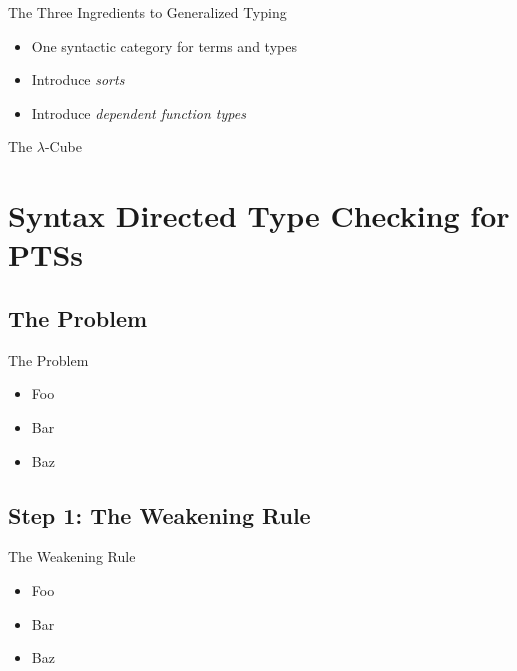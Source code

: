 \documentclass{beamer}
\begin{document}
\begin{frame}{The Three Ingredients to Generalized Typing}

  \begin{itemize}
    \item
      One syntactic category for terms and types
    \item
      Introduce \emph{sorts}
    \item
      Introduce \emph{dependent function types}
  \end{itemize}

\end{frame}


\begin{frame}{The $\lambda$-Cube}

\end{frame}


\section{Syntax Directed Type Checking for PTSs}

\subsection{The Problem}

\begin{frame}{The Problem}

  \begin{itemize}
    \item
      Foo
    \item
      Bar
    \item
      Baz
  \end{itemize}

\end{frame}


\subsection{Step 1: The Weakening Rule}

\begin{frame}{The Weakening Rule}

  \begin{itemize}
    \item
      Foo
    \item
      Bar
    \item
      Baz
  \end{itemize}

\end{frame}
\end{document}
